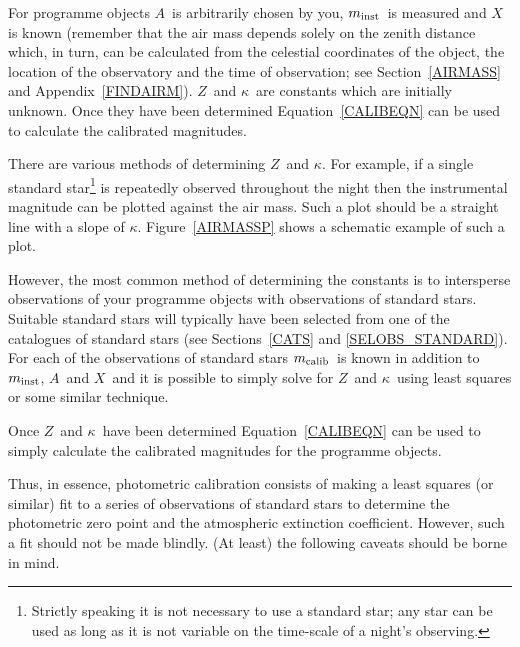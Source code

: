 \documentclass[twoside,11pt]{article}
\begin{document}
For programme objects $A$\, is arbitrarily chosen by you, $m_{\rm
inst}$\, is measured and $X$\, is known (remember that the air mass
depends solely on the zenith distance which, in turn, can be calculated
from the celestial coordinates of the object, the location of the
observatory and the time of observation; see Section~\ref{AIRMASS} and
Appendix~\ref{FINDAIRM}).  $Z$\, and $\kappa$\, are constants which are
initially unknown.  Once they have been determined Equation~\ref{CALIBEQN}
can be used to calculate the calibrated magnitudes.

There are various methods of determining $Z$\, and $\kappa$.  For example,
if a single standard star\footnote{Strictly speaking it is not necessary to
use a standard star; any star can be used as long as it is not variable on
the time-scale of a night's observing.} is repeatedly observed throughout
the night then the instrumental magnitude can be plotted against the air
mass.  Such a plot should be a straight line with a slope of $\kappa$.
Figure~\ref{AIRMASSP} shows a schematic example of such a plot.

However, the most common method of determining the constants is to
intersperse observations of your programme objects with observations
of standard stars.  Suitable standard stars will typically have been
selected from one of the catalogues of standard stars (see
Sections~\ref{CATS} and \ref{SELOBS_STANDARD}).  For each of the
observations of standard stars $m_{\rm calib}$\, is known in addition to
$m_{\rm inst}$, $A$\, and $X$\, and it is possible to simply solve for
$Z$\, and $\kappa$\, using least squares or some similar technique.

Once $Z$\, and $\kappa$\, have been determined Equation~\ref{CALIBEQN}
can be used to simply calculate the calibrated magnitudes for the
programme objects.

Thus, in essence, photometric calibration consists of making a least
squares (or similar) fit to a series of observations of standard stars
to determine the photometric zero point and the atmospheric extinction
coefficient.  However, such a fit should not be made blindly.  (At
least) the following caveats should be borne in mind.
\end{document}
